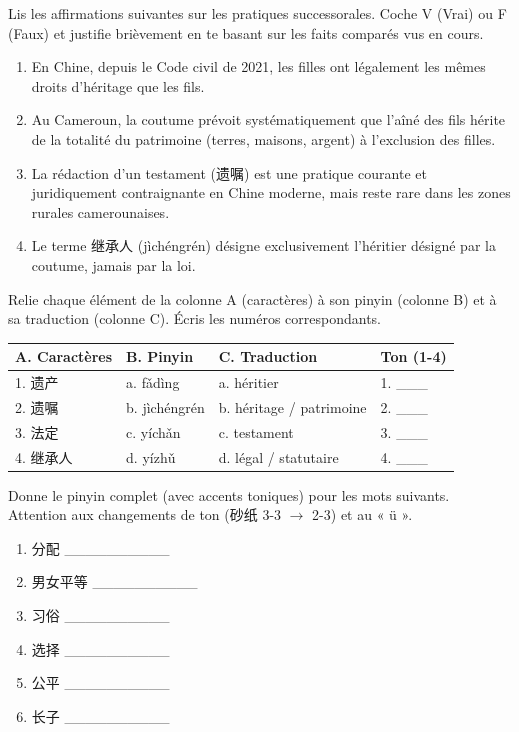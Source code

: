 \documentclass[11pt]{article}
\begin{document}
\begin{exercice}
Lis les affirmations suivantes sur les pratiques successorales. Coche V (Vrai) ou F (Faux) et justifie brièvement en te basant sur les faits comparés vus en cours.
\begin{enumerate}
    \item [V / F] En Chine, depuis le Code civil de 2021, les filles ont légalement les mêmes droits d'héritage que les fils.
    \item [V / F] Au Cameroun, la coutume prévoit systématiquement que l'aîné des fils hérite de la totalité du patrimoine (terres, maisons, argent) à l'exclusion des filles.
    \item [V / F] La rédaction d'un testament (遗嘱) est une pratique courante et juridiquement contraignante en Chine moderne, mais reste rare dans les zones rurales camerounaises.
    \item [V / F] Le terme 继承人 (jìchéngrén) désigne exclusivement l'héritier désigné par la coutume, jamais par la loi.
\end{enumerate}
\end{exercice}

\begin{exercice}
Relie chaque élément de la colonne A (caractères) à son pinyin (colonne B) et à sa traduction (colonne C). Écris les numéros correspondants.

\begin{center}
\begin{tabularx}{\linewidth}{|X|X|X|X|}
\hline
\rowcolor{popblueL} \textbf{A. Caractères} & \textbf{B. Pinyin} & \textbf{C. Traduction} & \textbf{Ton (1-4)} \\
\hline
1. 遗产 & a. fǎdìng & a. héritier & 1. \_\_\_ \\
2. 遗嘱 & b. jìchéngrén & b. héritage / patrimoine & 2. \_\_\_ \\
3. 法定 & c. yíchǎn & c. testament & 3. \_\_\_ \\
4. 继承人 & d. yízhǔ & d. légal / statutaire & 4. \_\_\_ \\
\hline
\end{tabularx}
\end{center}
\end{exercice}

\begin{exercice}
Donne le pinyin complet (avec accents toniques) pour les mots suivants. Attention aux changements de ton (砂纸 3-3 $\to$ 2-3) et au « ü ».
\begin{enumerate}
    \item 分配 \_\_\_\_\_\_\_\_\_\_
    \item 男女平等 \_\_\_\_\_\_\_\_\_\_
    \item 习俗 \_\_\_\_\_\_\_\_\_\_
    \item 选择 \_\_\_\_\_\_\_\_\_\_
    \item 公平 \_\_\_\_\_\_\_\_\_\_
    \item 长子 \_\_\_\_\_\_\_\_\_\_
\end{enumerate}
\end{exercice}
\end{document}
